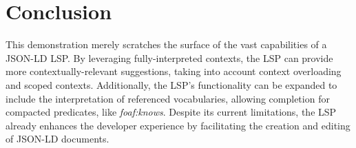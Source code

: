 \documentclass[
]{ceurart}
\begin{document}
\section{Conclusion}

This demonstration merely scratches the surface of the vast capabilities of a JSON-LD LSP. By leveraging fully-interpreted contexts, the LSP can provide more contextually-relevant suggestions, taking into account context overloading and scoped contexts. Additionally, the LSP's functionality can be expanded to include the interpretation of referenced vocabularies, allowing completion for compacted predicates, like \textit{foaf:knows}. Despite its current limitations, the LSP already enhances the developer experience by facilitating the creation and editing of JSON-LD documents.



\end{document}
